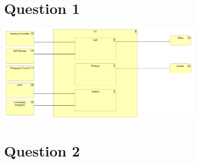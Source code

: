 \documentclass[a4paper,12pt]{texDoc}
\begin{document}
\maketitle %


\section*{Question 1}

\begin{center}
\includegraphics[width=0.75\textwidth]{ea_h3.png}
\end{center}

\section*{Question 2}

\break




\end{document}
